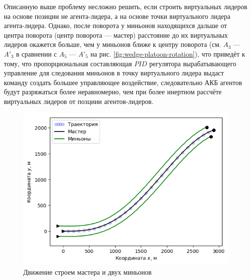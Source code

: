 \documentclass[a4paper, 14pt]{extarticle}
\begin{document}
Описанную выше проблему несложно решить, если строить виртуальных лидеров на основе позиции не агента-лидера, а на основе точки виртуального лидера агента-лидера. Однако, после поворота у миньонов находящихся дальше от центра поворота (центр поворота — мастер) расстояние до их виртуальных лидеров окажется больше, чем у миньонов ближе к центру поворота (см. $A_3$ — $A'_3$ в сравнении с $A_5$ — $A'_5$ на рис. \ref{fig:wedge-platoon-rotation}), что приведёт к тому, что пропорциональная составляющая $PID$ регулятора вырабатывающего управление для следования миньонов в точку виртуального лидера выдаст команду создать большее управляющее воздействие, следовательно АКБ агентов будут разряжаться более неравномерно, чем при более инертном рассчёте виртуальных лидеров от позциии агентов-лидеров.

\begin{figure}[!htbp]
	\centering
	\includegraphics[width=0.7\linewidth]{platoon-trajectory-0}
	\caption{Движение строем мастера и двух миньонов}
	\label{fig:platoon-trajectory-0}
\end{figure}


\newpage
{}%
\end{document}
